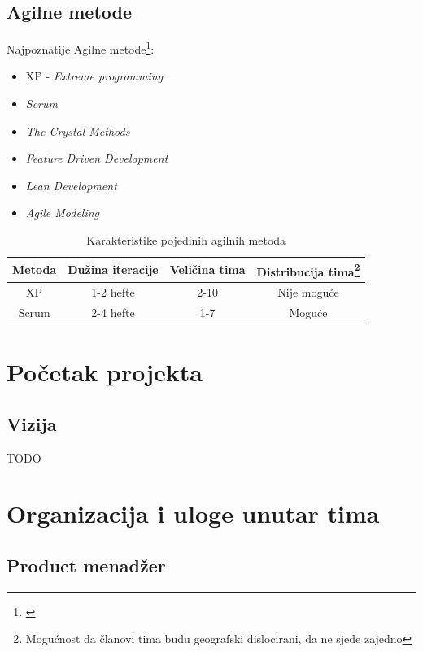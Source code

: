 \documentclass[lmodern, utf8, zavrsni]{fit}
\begin{document}
\section{Agilne metode}

Najpoznatije Agilne metode\footnote{\citep{agiledacs}}:
\begin{itemize}
  \item XP - \emph{Extreme programming}
  \item \emph{Scrum}
  \item \emph{The Crystal Methods}
  \item \emph{Feature Driven Development}
  \item \emph{Lean Development}
  \item \emph{Agile Modeling}
\end{itemize}

\begin{savenotes}
\begin{table}[ht]
\centering
\begin{tabular}{c c c c}
\hline\hline
Metoda & Dužina iteracije & Veličina tima & Distribucija tima\footnote{{Mogućnost da članovi tima budu geografski dislocirani, da ne sjede zajedno}} \\
\hline
   XP  & 1-2 hefte & 2-10 & Nije moguće \\
  Scrum & 2-4 hefte & 1-7 & Moguće \\ [1ex]
\hline
\end{tabular}
\label{table:methodkarakteristike}
\caption{Karakteristike pojedinih agilnih metoda}
\end{table}
\end{savenotes}

\chapter{Početak projekta}

\section{Vizija}


TODO

\chapter{Organizacija i uloge unutar tima}

\section{Product menadžer}
\end{document}
